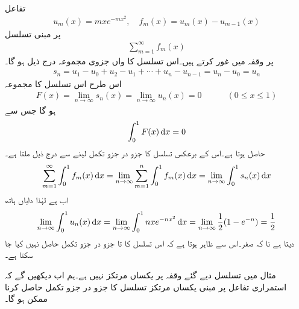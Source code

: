 \quad {}\\
تفاعل
\begin{align*}
u_m(x)=mxe^{-mx^2}, \quad f_m(x)=u_m(x)-u_{m-1}(x)
\end{align*}
پر مبنی تسلسل
\begin{align*}
\sum\limits_{m=1}^{\infty} f_m(x)
\end{align*}
پر وقفہ  میں غور کرتے ہیں۔اس تسلسل کا  واں جزوی مجموعہ درج ذیل ہو گا۔
\begin{align*}
s_n=u_1-u_0+u_2-u_1+\cdots+u_n-u_{n-1}=u_n-u_0=u_n
\end{align*}
اس طرح اس تسلسل کا مجموعہ
\begin{align*}
F(x)=\lim_{n\to \infty} s_n(x)=\lim_{n\to \infty} u_n(x)=0\quad \quad \quad (0\le x\le 1)
\end{align*}
ہو گا جس سے
\begin{align*}
\int_0^1 F(x)\dif x=0
\end{align*}
حاصل ہوتا ہے۔اس کے برعکس تسلسل کا جزو در جزو تکمل لینے سے درج ذیل ملتا ہے۔
\begin{align*}
\sum\limits_{m=1}^{\infty} \int_0^1 f_m(x)\dif x=\lim_{n\to \infty} \sum\limits_{m=1}^{n}\int_0^1 f_m(x)\dif x=\lim_{n\to \infty} \int_0^1 s_n(x)\dif x
\end{align*}
اب   ہے لہٰذا دایاں ہاتھ 
\begin{align*}
\lim_{n\to \infty} \int_0^1 u_n(x)\dif x=\lim_{n\to \infty}\int_0^1 nxe^{-nx^2}\dif x=\lim_{n\to \infty} \frac{1}{2}(1-e^{-n})=\frac{1}{2}
\end{align*}
دیتا ہے نا کہ صفر۔اس سے ظاہر ہوتا ہے کہ اس تسلسل کا  تا  جزو در جزو تکمل حاصل نہیں کیا جا سکتا ہے۔ 

مثال  میں تسلسل دیے گئے وقفہ پر یکساں مرتکز نہیں ہے۔ہم اب دیکھیں گے کہ استمراری تفاعل پر مبنی یکساں مرتکز تسلسل کا جزو در جزو تکمل حاصل کرنا ممکن ہو گا۔

